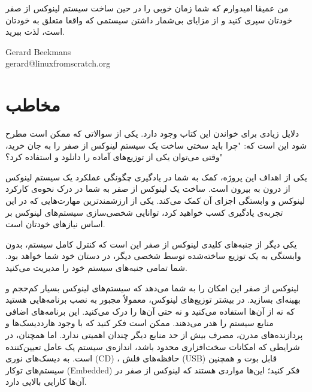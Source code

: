 \documentclass{book}
\begin{document}
\par
من عمیقا امیدوارم که شما زمان خوبی را در حین ساخت سیستم لینوکس از صفر خودتان سپری کنید و از مزایای بی‌شمار داشتن 
سیستمی که واقعا متعلق به خودتان است، لذت ببرید.
\newline
\newline

\begin{flushleft}

	Gerard Beekmans \\
	gerard@linuxfromscratch.org
	
\end{flushleft}



\newpage

\section{مخاطب}

دلایل زیادی برای خواندن این کتاب وجود دارد. یکی از سوالاتی که ممکن است مطرح شود این است که: "چرا باید سختی ساخت یک سیستم لینوکس از صفر را به جان خرید، وقتی می‌توان یکی از توزیع‌های آماده را دانلود و استفاده کرد؟"
\newline

\par
یکی از اهداف این پروژه، کمک به شما در یادگیری چگونگی عملکرد یک سیستم لینوکس از درون به بیرون است. ساخت یک لینوکس از صفر به شما در درک نحوه‌ی کارکرد لینوکس و وابستگی اجزای آن کمک می‌کند. یکی از ارزشمندترین مهارت‌هایی که در این تجربه‌ی یادگیری کسب خواهید کرد، توانایی شخصی‌سازی سیستم‌های لینوکس بر اساس نیازهای خودتان است.
\newline

\par
یکی دیگر از جنبه‌های کلیدی لینوکس از صفر این است که کنترل کامل سیستم، بدون وابستگی به یک توزیع ساخته‌شده توسط شخصی دیگر، در دستان خود شما خواهد بود. شما تمامی جنبه‌های سیستم خود را مدیریت می‌کنید.
\newline

\par
لینوکس از صفر این امکان را به شما می‌دهد که سیستم‌های لینوکس بسیار کم‌حجم و بهینه‌ای بسازید. در بیشتر توزیع‌های لینوکس، معمولاً مجبور به نصب برنامه‌هایی هستید که نه از آن‌ها استفاده می‌کنید و نه حتی آن‌ها را درک می‌کنید. این برنامه‌های اضافی منابع سیستم را هدر می‌دهند. ممکن است فکر کنید که با وجود هارددیسک‌ها و پردازنده‌های مدرن، مصرف بیش از حد منابع دیگر چندان اهمیتی ندارد. اما همچنان، در شرایطی که امکانات سخت‌افزاری محدود باشد، اندازه‌ی سیستم یک عامل تعیین‌کننده است. به دیسک‌های نوری (CD) ، حافظه‌های فلش (USB) قابل بوت و همچنین سیستم‌های توکار (Embedded) فکر کنید؛ این‌ها مواردی هستند که لینوکس از صفر در آن‌ها کارایی بالایی دارد.
\newline
\end{document}
